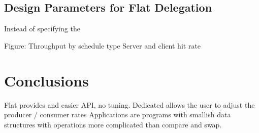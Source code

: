 \documentclass{uicthesi}
\begin{document}
\section{Design Parameters for Flat Delegation}

Instead of specifying the 

Figure: Throughput by schedule type
	Server and client hit rate

\chapter{Conclusions}
Flat provides and easier API, no tuning. 
Dedicated allows the user to adjust the producer / consumer rates
Applications are programs with smallish data structures with operations more complicated than compare and swap. 
\end{document}
